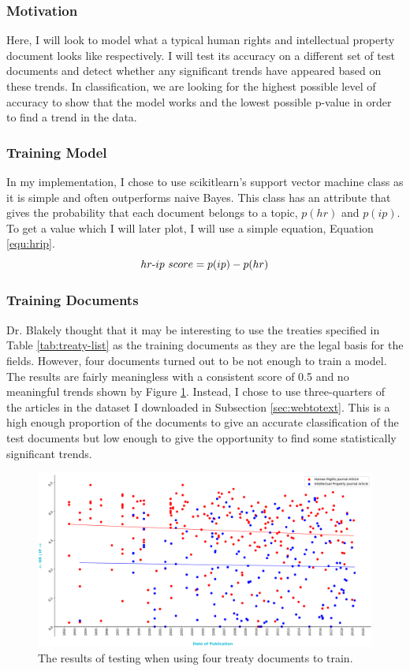			\subsubsection{Motivation}
				Here, I will look to model what a typical human rights and intellectual property document looks like respectively. I will test its accuracy on a different set of test documents and detect whether any significant trends have appeared based on these trends. In classification, we are looking for the highest possible level of accuracy to show that the model works and the lowest possible p-value in order to find a trend in the data.
			\subsubsection{Training Model}
				In my implementation, I chose to use scikitlearn's support vector machine class as it is simple and often outperforms naive Bayes. This class has an attribute that gives the probability that each document belongs to a topic, $p(hr)$ and $p(ip)$. To get a value which I will later plot, I will use a simple equation, Equation \ref{equ:hrip}.
				\begin{equation}\label{equ:hrip}
					hr\textnormal{-}ip\textnormal{ }score = p(ip) - p(hr)
				\end{equation}
			\subsubsection{Training Documents}
				Dr. Blakely thought that it may be interesting to use the treaties specified in Table \ref{tab:treaty-list} as the training documents as they are the legal basis for the fields. However, four documents turned out to be not enough to train a model. The results are fairly meaningless with a consistent score of 0.5 and no meaningful trends shown by Figure \ref{fig:train-treat}. Instead, I chose to use three-quarters of the articles in the dataset I downloaded in Subsection \ref{sec:webtotext}. This is a high enough proportion of the documents to give an accurate classification of the test documents but low enough to give the opportunity to find some statistically significant trends.	
			\begin{figure}
    			\centering
    			\includegraphics[width=0.9\linewidth]{resources/images/treaties_hrip.png}
    			\caption{The results of testing when using four treaty documents to train.}
    			\label{fig:train-treat}
			\end{figure}
			
